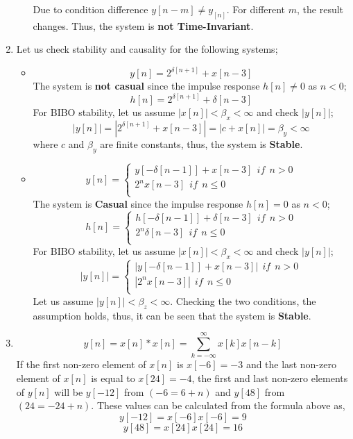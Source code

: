 \documentclass[a4paper,12pt]{article}
\begin{document}
\begin{enumerate}
\begin{itemize}
     		Due to condition difference $y[n-m] \neq y_[n]$. For different $m$, the result changes. Thus, the system is \textbf{not Time-Invariant}.
				  
		\end{itemize}
		
	
	\item Let us check stability and causality for the following systems;
		\begin{itemize}
			\item 
			$$ y[n]=2^{\delta [n+1]}+x[n-3]$$ 
			The system is \textbf{not casual} since the impulse response $h[n] \neq 0$ as $n<0$;
			$$ h[n]=2^{\delta [n+1]}+\delta [n-3] $$
			For BIBO stability, let us assume $|x[n]|<\beta_x<\infty $ and check $|y[n]|$;
			$$	|y[n]|=|2^{\delta [n+1]}+x[n-3]|=|c+x[n]|=\beta_y<\infty	$$
			where $c$ and $\beta_y$ are finite constants, thus, the system is \textbf{Stable}. 
			 
			
			\item $$	y[n] = 
     		\begin{cases}
     			y[-\delta [n-1]]+x[n-3] ~~ if ~~ n>0 \\
     			2^n x[n-3] ~~ if ~~ n\leq 0\\
     		\end{cases}	$$
     		The system is \textbf{Casual} since the impulse response $h[n]=0$ as $n<0$;     		
     		$$	h[n] = 
     		\begin{cases}
     			h[-\delta [n-1]]+\delta [n-3] ~~ if ~~ n>0 \\
     			2^n \delta[n-3] ~~ if ~~ n\leq 0\\
     		\end{cases}		$$
     		For BIBO stability, let us assume $|x[n]|<\beta_x<\infty $ and check $|y[n]|$;
     		$$	|y[n]| = 
     		\begin{cases}
     			|y[-\delta [n-1]]+x[n-3]| ~~ if ~~ n>0 \\
     			|2^n x[n-3]| ~~ if ~~ n\leq 0\\
     		\end{cases}	$$
     		Let us assume $|y[n]|<\beta_z<\infty$. Checking the two conditions, the assumption holds, thus, it can be seen that the system is \textbf{Stable}. 
		\end{itemize}
	
	\item 
		$$	y[n]=x[n]*x[n]=\sum_{k=-\infty}^{\infty} x[k]x[n-k]	$$
		If the first non-zero element of $x[n]$ is $x[-6]=-3$ and the last non-zero element of $x[n]$ is equal to $x[24]=-4$, the first and last non-zero elements of $y[n]$ will be $y[-12]$ from $(-6=6+n)$ and $y[48]$ from $(24=-24+n)$. These values can be calculated from the formula above as,
			$$ \boxed{y[-12]=x[-6]x[-6]=9} $$ 
			$$ \boxed{y[48]=x[24]x[24]=16} $$ 
			

\end{enumerate}
\end{document}
